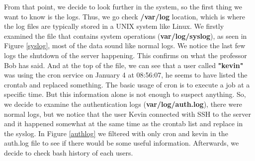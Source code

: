 \documentclass[a4paper,12pt]{article}
\begin{document}
From that point, we decide to look further in the system, so the first thing we want to know is the logs. Thus, we go check \textbf{/var/log} location, which is where the log files are typically stored in a UNIX system like Linux. We firstly examined the file that contains system operations (\textbf{var/log/syslog}), as seen in Figure \ref{syslog}, most of the data sound like normal logs. We notice the last few logs the shutdown of the server happening. This confirms on what the professor Bob has said. And at the top of the file, we can see that a user called \textbf{"kevin"} was using the cron service on January 4 at 08:56:07, he seems to have listed the crontab and replaced something. The basic usage of cron is to execute a job at a specific time. But this information alone is not enough to suspect anything. So, we decide to examine the authentication logs (\textbf{var/log/auth.log}), there were normal logs, but we notice that the user Kevin connected with SSH to the server and it happened somewhat at the same time as the crontab list and replace in the syslog. In Figure \ref{authlog} we filtered with only cron and kevin in the auth.log file to see if there would be some useful information. Afterwards, we decide to check bash history of each users. 
\end{document}
